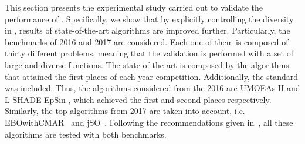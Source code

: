 This section presents the experimental study carried out to validate the performance of \DEEDM{}.
%
Specifically, we show that by explicitly controlling the diversity in \DE{}, results of state-of-the-art algorithms
are improved further.
%
Particularly, the benchmarks of \CEC{} 2016 and \CEC{} 2017 are considered.
%
Each one of them is composed of thirty different problems, meaning that the validation is performed with a set of large and diverse
functions.
%
The state-of-the-art is composed by the algorithms that attained the first places of each year competition.
%
Additionally, the standard \DE{} was included.
%
Thus, the algorithms considered from the \CEC{} 2016 are UMOEAs-II \cite{elsayed2016testing} and L-SHADE-EpSin \cite{awad2016ensemble}, which achieved 
the first and second places respectively.
%
Similarly, the top algorithms from \CEC{} 2017 are taken into account, i.e. EBOwithCMAR~\cite{kumar2017improving} and jSO~\cite{brest2017single}.
%
%
%
Following the recommendations given in~\cite{molina2017analysis}, all these algorithms are tested with both benchmarks.

